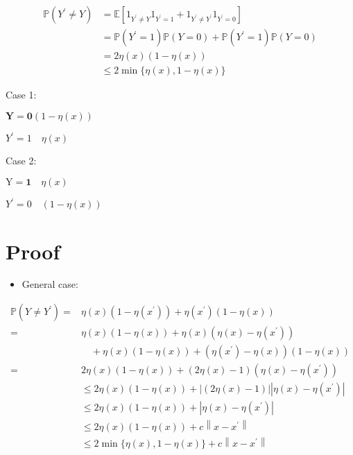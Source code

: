 $$
\begin{aligned}
\mathbb{P}\left(Y^{\prime} \neq Y\right) & =\mathbb{E}\left[1_{Y^{\prime} \neq Y} 1_{Y^{\prime}=1}+1_{Y^{\prime} \neq Y^{\prime}} 1_{Y^{\prime}=0}\right] \\
& =\mathbb{P}\left(Y^{\prime}=1\right) \mathbb{P}(Y=0)+\mathbb{P}\left(Y^{\prime}=1\right) \mathbb{P}(Y=0) \\
& =2 \eta(x)(1-\eta(x)) \\
& \leq 2 \min \{\eta(x), 1-\eta(x)\}
\end{aligned}
$$

Case 1:

$\mathbf{Y}=\mathbf{0}(1-\eta(x))$

$Y^{\prime}=1 \quad \eta(x)$

Case 2:

$\mathrm{Y}=\mathbf{1} \quad \eta(x)$

$Y^{\prime}=0 \quad(1-\eta(x))$

\section*{Proof}
\begin{itemize}
  \item General case:
\end{itemize}

$$
\begin{aligned}
\mathbb{P}\left(Y \neq Y^{\prime}\right)= & \eta(x)\left(1-\eta\left(x^{\prime}\right)\right)+\eta\left(x^{\prime}\right)(1-\eta(x)) \\
= & \eta(x)(1-\eta(x))+\eta(x)\left(\eta(x)-\eta\left(x^{\prime}\right)\right) \\
& \quad+\eta(x)(1-\eta(x))+\left(\eta\left(x^{\prime}\right)-\eta(x)\right)(1-\eta(x)) \\
= & 2 \eta(x)(1-\eta(x))+(2 \eta(x)-1)\left(\eta(x)-\eta\left(x^{\prime}\right)\right) \\
& \leq 2 \eta(x)(1-\eta(x))+|(2 \eta(x)-1)|\left|\eta(x)-\eta\left(x^{\prime}\right)\right| \\
& \leq 2 \eta(x)(1-\eta(x))+\left|\eta(x)-\eta\left(x^{\prime}\right)\right| \\
& \leq 2 \eta(x)(1-\eta(x))+c\left\|x-x^{\prime}\right\| \\
& \leq 2 \min \{\eta(x), 1-\eta(x)\}+c\left\|x-x^{\prime}\right\|
\end{aligned}
$$


